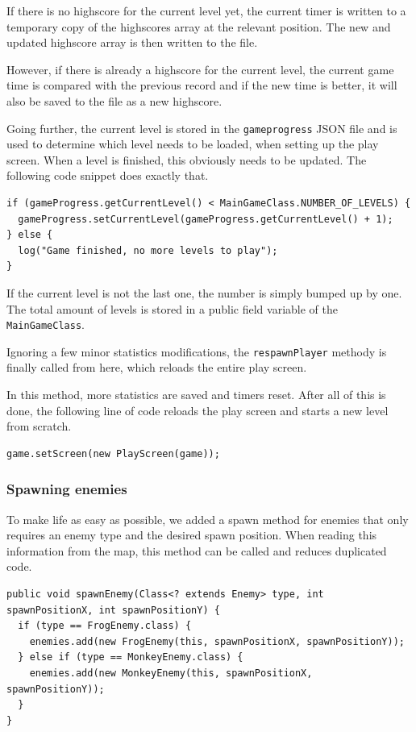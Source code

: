 \documentclass[12p]{article}
\begin{document}
If there is no highscore for the current level yet, the current timer is written to a temporary copy of the highscores array at the relevant position. The new and updated highscore array is then written to the file.

However, if there is already a highscore for the current level, the current game time is compared with the previous record and if the new time is better, it will also be saved to the file as a new highscore.

Going further, the current level is stored in the \texttt{gameprogress} JSON file and is used to determine which level needs to be loaded, when setting up the play screen. When a level is finished, this obviously needs to be updated. The following code snippet does exactly that.

\begin{verbatim}
if (gameProgress.getCurrentLevel() < MainGameClass.NUMBER_OF_LEVELS) {
  gameProgress.setCurrentLevel(gameProgress.getCurrentLevel() + 1);
} else {
  log("Game finished, no more levels to play");
}
\end{verbatim}

If the current level is not the last one, the number is simply bumped up by one. The total amount of levels is stored in a public field variable of the \texttt{MainGameClass}.

Ignoring a few minor statistics modifications, the \texttt{respawnPlayer} methody is finally called from here, which reloads the entire play screen.

In this method, more statistics are saved and timers reset. After all of this is done, the following line of code reloads the play screen and starts a new level from scratch.

\begin{verbatim}
game.setScreen(new PlayScreen(game));
\end{verbatim}

\subsubsection{Spawning enemies} 

To make life as easy as possible, we added a spawn method for enemies that only requires an enemy type and the desired spawn position. When reading this information from the map, this method can be called and reduces duplicated code.

\begin{verbatim}
public void spawnEnemy(Class<? extends Enemy> type, int spawnPositionX, int spawnPositionY) {
  if (type == FrogEnemy.class) {
    enemies.add(new FrogEnemy(this, spawnPositionX, spawnPositionY));
  } else if (type == MonkeyEnemy.class) {
    enemies.add(new MonkeyEnemy(this, spawnPositionX, spawnPositionY));
  }
}
\end{verbatim}
\end{document}
